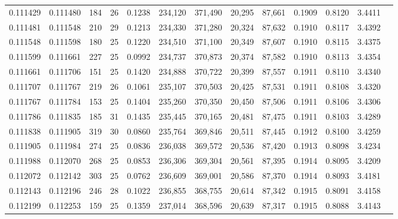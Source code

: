 \begin{tabular}{rrrrrrrrrrrrr}
0.111429 & 0.111480 & 184 &  26 &                                     0.1238 & 234,120 & 371,490 &  20,295 &  87,661 & 0.1909 & 0.8120 & 3.4411 \\
0.111481 & 0.111548 & 210 &  29 &                                     0.1213 & 234,330 & 371,280 &  20,324 &  87,632 & 0.1910 & 0.8117 & 3.4392 \\
0.111548 & 0.111598 & 180 &  25 &                                     0.1220 & 234,510 & 371,100 &  20,349 &  87,607 & 0.1910 & 0.8115 & 3.4375 \\
0.111599 & 0.111661 & 227 &  25 &                                     0.0992 & 234,737 & 370,873 &  20,374 &  87,582 & 0.1910 & 0.8113 & 3.4354 \\
0.111661 & 0.111706 & 151 &  25 &                                     0.1420 & 234,888 & 370,722 &  20,399 &  87,557 & 0.1911 & 0.8110 & 3.4340 \\
0.111707 & 0.111767 & 219 &  26 &                                     0.1061 & 235,107 & 370,503 &  20,425 &  87,531 & 0.1911 & 0.8108 & 3.4320 \\
0.111767 & 0.111784 & 153 &  25 &                                     0.1404 & 235,260 & 370,350 &  20,450 &  87,506 & 0.1911 & 0.8106 & 3.4306 \\
0.111786 & 0.111835 & 185 &  31 &                                     0.1435 & 235,445 & 370,165 &  20,481 &  87,475 & 0.1911 & 0.8103 & 3.4289 \\
0.111838 & 0.111905 & 319 &  30 &                                     0.0860 & 235,764 & 369,846 &  20,511 &  87,445 & 0.1912 & 0.8100 & 3.4259 \\
0.111905 & 0.111984 & 274 &  25 &                                     0.0836 & 236,038 & 369,572 &  20,536 &  87,420 & 0.1913 & 0.8098 & 3.4234 \\
0.111988 & 0.112070 & 268 &  25 &                                     0.0853 & 236,306 & 369,304 &  20,561 &  87,395 & 0.1914 & 0.8095 & 3.4209 \\
0.112072 & 0.112142 & 303 &  25 &                                     0.0762 & 236,609 & 369,001 &  20,586 &  87,370 & 0.1914 & 0.8093 & 3.4181 \\
0.112143 & 0.112196 & 246 &  28 &                                     0.1022 & 236,855 & 368,755 &  20,614 &  87,342 & 0.1915 & 0.8091 & 3.4158 \\
0.112199 & 0.112253 & 159 &  25 &                                     0.1359 & 237,014 & 368,596 &  20,639 &  87,317 & 0.1915 & 0.8088 & 3.4143 \\

\end{tabular}
